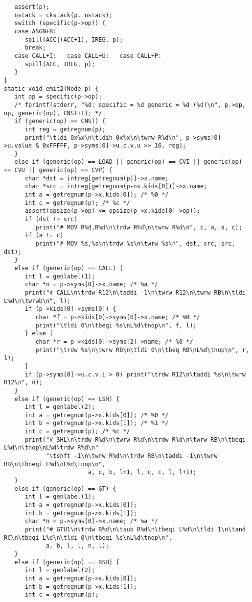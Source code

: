 {\begin{verbatim}
   assert(p);
   nstack = ckstack(p, nstack);
   switch (specific(p->op)) {
   case ASGN+B:
      spill(ACC|(ACC+1), IREG, p);
      break;
   case CALL+I:   case CALL+U:   case CALL+P:
      spill(ACC, IREG, p);
   }
}
static void emit2(Node p) {
   int op = specific(p->op);
   /* fprintf(stderr, "%d: specific = %d generic = %d (%d)\n", p->op, op, generic(op), CNST+I); */
   if (generic(op) == CNST) {
      int reg = getregnum(p);
      print("\tldi 0x%x\n\tldih 0x%x\n\twrw R%d\n", p->syms[0]->u.value & 0xFFFFF, p->syms[0]->u.c.v.u >> 16, reg);
   }
   else if (generic(op) == LOAD || generic(op) == CVI || generic(op) == CVU || generic(op) == CVP) {
      char *dst = intreg[getregnum(p)]->x.name;
      char *src = intreg[getregnum(p->x.kids[0])]->x.name;
      int a = getregnum(p->x.kids[0]); /* %0 */
      int c = getregnum(p); /* %c */
      assert(opsize(p->op) <= opsize(p->x.kids[0]->op));
      if (dst != src)
         print("# MOV R%d,R%d\n\trdw R%d\n\twrw R%d\n", c, a, a, c);
      if (a != c)
         print("# MOV %s,%s\n\trdw %s\n\twrw %s\n", dst, src, src, dst);
   }
   else if (generic(op) == CALL) {
      int l = genlabel(1);
      char *n = p->syms[0]->x.name; /* %a */
      print("# CALL\n\trdw R12\n\taddi -1\n\twrw R12\n\twrw RB\n\tldi L%d\n\twrwb\n", l);
      if (p->kids[0]->syms[0]) {
         char *f = p->kids[0]->syms[0]->x.name; /* %0 */
         print("\tldi 0\n\tbeqi %s\nL%d\tnop\n", f, l);
      } else {
         char *r = p->kids[0]->syms[2]->name; /* %0 */
         print("\trdw %s\n\twrw RB\n\tldi 0\n\tbeq RB\nL%d\tnop\n", r, l);
      }
      if (p->syms[0]->u.c.v.i > 0) print("\trdw R12\n\taddi %s\n\twrw R12\n", n);
   }
   else if (generic(op) == LSH) {
      int l = genlabel(2);
      int a = getregnum(p->x.kids[0]); /* %0 */
      int b = getregnum(p->x.kids[1]); /* %1 */
      int c = getregnum(p); /* %c */
      print("# SHL\n\trdw R%d\n\twrw R%d\n\trdw R%d\n\twrw RB\n\tbeqi L%d\n\tnop\nL%d\trdw R%d\n"
            "\tshft -1\n\twrw R%d\n\trdw RB\n\taddi -1\n\twrw RB\n\tbneqi L%d\nL%d\tnop\n",
						a, c, b, l+1, l, c, c, l, l+1);
   }
   else if (generic(op) == GT) {
      int l = genlabel(1);
      int a = getregnum(p->x.kids[0]);
      int b = getregnum(p->x.kids[1]);
      char *n = p->syms[0]->x.name; /* %a */
      print("# GTU1\n\trdw R%d\n\tsub R%d\n\tbeqi L%d\n\tldi 1\n\tand RC\n\tbeqi L%d\n\tldi 0\n\tbeqi %s\nL%d\tnop\n",
            a, b, l, l, n, l);
   }
   else if (generic(op) == RSH) {
      int l = genlabel(2);
      int a = getregnum(p->x.kids[0]);
      int b = getregnum(p->x.kids[1]);
      int c = getregnum(p);

\end{verbatim}}
